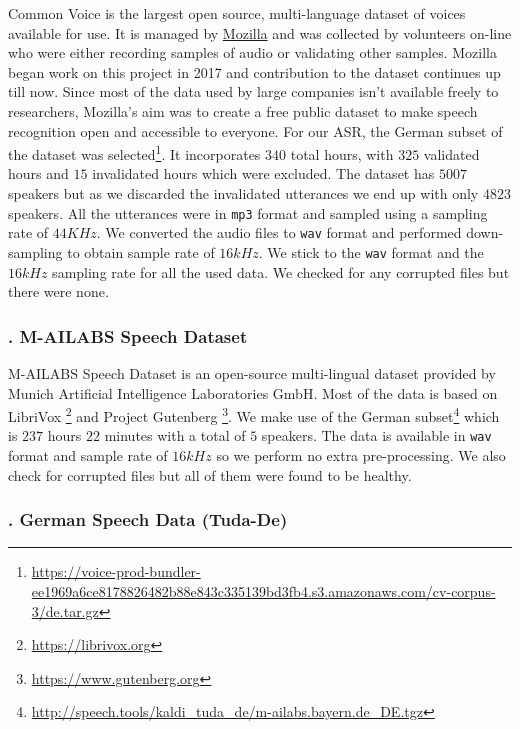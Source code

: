 Common Voice is the largest open source, multi-language dataset of voices available for use. It is managed by \href{https://www.mozilla.org/en-US/}{Mozilla} and was collected by volunteers on-line who were either recording samples of audio or validating other samples. Mozilla began work on this project in 2017 and contribution to the dataset continues up till now. Since most of the data used by large companies isn't available freely to researchers, Mozilla's aim was to create a free public dataset to make speech recognition open and accessible to everyone.
For our \ac{ASR}, the German subset of the dataset was selected\footnote{\url{https://voice-prod-bundler-ee1969a6ce8178826482b88e843c335139bd3fb4.s3.amazonaws.com/cv-corpus-3/de.tar.gz}}. It incorporates $340$ total hours, with $325$ validated hours and $15$ invalidated hours which were excluded. The dataset has $5007$ speakers but as we discarded the invalidated utterances we end up with only $4823$ speakers. 
All the utterances were in \texttt{mp3} format and sampled using a sampling rate of $44 KHz$. We converted the audio files to \texttt{wav} format and performed down-sampling to obtain sample rate of $16 kHz$. We stick to the \texttt{wav} format and the $16 kHz$ sampling rate for all the used data. We checked for any corrupted files but there were none.


\subsubsection{. M-AILABS Speech Dataset}
\label{meth:s2_sub4_subsub2}

M-AILABS Speech Dataset is an open-source multi-lingual dataset provided by Munich Artificial Intelligence Laboratories GmbH. Most of the data is based on LibriVox \footnote{\url{https://librivox.org}} and Project Gutenberg \footnote{\url{https://www.gutenberg.org}}. We make use of the German subset\footnote{\url{http://speech.tools/kaldi_tuda_de/m-ailabs.bayern.de_DE.tgz}} which is $237$ hours $22$ minutes with a total of $5$ speakers. The data is available in \texttt{wav} format and sample rate of $16 kHz$ so we perform no extra pre-processing. We also check for corrupted files but all of them were found to be healthy.

\subsubsection{. German Speech Data (Tuda-De)}
\label{meth:s2_sub4_subsub3}

